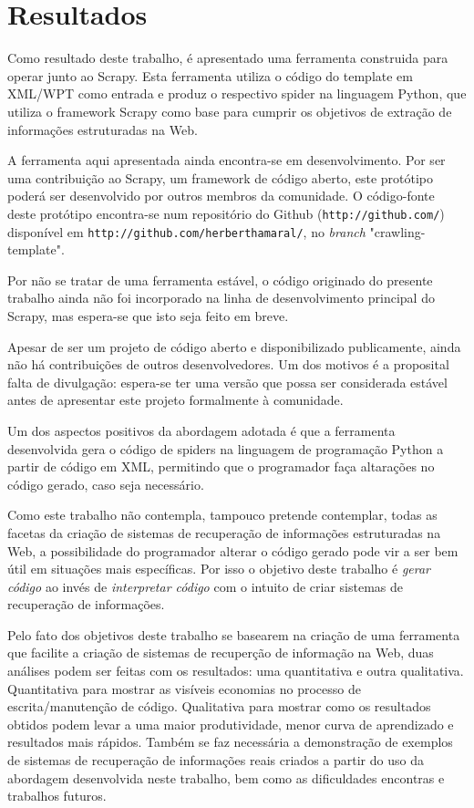 \chapter{Resultados}
\thispagestyle{fancy}

Como resultado deste trabalho, é apresentado uma ferramenta construida para operar junto ao Scrapy. Esta ferramenta utiliza o código do template em XML/WPT como entrada e produz o respectivo spider na linguagem Python, que utiliza o framework Scrapy como base para cumprir os objetivos de extração de informações estruturadas na Web.

A ferramenta aqui apresentada ainda encontra-se em desenvolvimento. Por ser uma contribuição ao Scrapy, um framework de código aberto, este protótipo poderá ser desenvolvido por outros membros da comunidade. O código-fonte deste protótipo encontra-se num repositório do Github (\texttt{http://github.com/}) disponível em \texttt{http://github.com/herberthamaral/}, no \emph{branch} "crawling-template".

Por não se tratar de uma ferramenta estável, o código originado do presente trabalho ainda não foi incorporado na linha de desenvolvimento principal do Scrapy, mas espera-se que isto seja feito em breve.

Apesar de ser um projeto de código aberto e disponibilizado publicamente, ainda não há contribuições de outros desenvolvedores. Um dos motivos é a proposital falta de divulgação: espera-se ter uma versão que possa ser considerada estável antes de apresentar este projeto formalmente à comunidade.

Um dos aspectos positivos da abordagem adotada é que a ferramenta desenvolvida gera o código de spiders na linguagem de programação Python a partir de código em XML, permitindo que o programador faça altarações no código gerado, caso seja necessário. 

Como este trabalho não contempla, tampouco pretende contemplar, todas as facetas da criação de sistemas de recuperação de informações estruturadas na Web, a possibilidade do programador alterar o código gerado pode vir a ser bem útil em situações mais específicas. Por isso o objetivo deste trabalho é \emph{gerar código} ao invés de \emph{interpretar código} com o intuito de criar sistemas de recuperação de informações.

Pelo fato dos objetivos deste trabalho se basearem na criação de uma ferramenta que facilite a criação de sistemas de recuperção de informação na Web, duas análises podem ser feitas com os resultados: uma quantitativa e outra qualitativa. Quantitativa para mostrar as visíveis economias no processo de escrita/manutenção de código. Qualitativa para mostrar como os resultados obtidos podem levar a uma maior produtividade, menor curva de aprendizado e resultados mais rápidos. Também se faz necessária a demonstração de exemplos de sistemas de recuperação de informações reais criados a partir do uso da abordagem desenvolvida neste trabalho, bem como as dificuldades encontras e trabalhos futuros.

